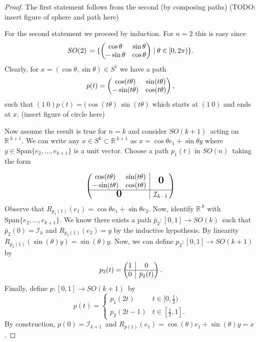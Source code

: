\documentclass[12pt,a4paper]{article}
\newcommand{\rR}{\ensuremath{\mathbb{R}\,}}
\newcommand{\gsok}[1]{\ensuremath{SO(#1)\,}}
\newcommand{\ci}[1]{\ensuremath{\mathcal{I}_{#1}\,}}
\newcommand{\rvline}{\hspace*{-\arraycolsep}\vline\hspace*{-\arraycolsep}}
\newcommand{\bigzero}{\mbox{\normalfont\Large\bfseries 0}}
\begin{document}
\begin{proof}
The first statement follows from the second (by composing paths) (TODO: insert figure of sphere and path here)

For the second statement we proceed by induction. For $n = 2$ this is easy since
\[
\gsok{2} = \{\pmqty{\cos \theta & \sin \theta \\ -\sin \theta & \cos \theta}\mid \theta \in [0, 2\pi )\}.
\]
Clearly, for $x = (\cos\theta, \sin\theta) \in S^1$ we have a path
\[
p(t) = \pmqty{\cos (t\theta) & \sin (t\theta) \\ -\sin (t\theta) & \cos (t\theta)},
\]
such that $(1\ 0)p(t) = (\cos(t\theta)\ \sin(t\theta)$ which starts at $(1\ 0)$ and ends at $x$.
(insert figure of circle here)

Now assume the result is true for $n=k$ and consider \gsok{k+1} acting on $\rR^{k+1}$. We can write any $x \in S^k \subset \rR^{k+1}$ as $x = \cos\theta e_1 + \sin\theta y$ where $y \in \mbox{Span}\{e_2, \hdots, e_{k+1}\}$ is a unit vector. Choose a path $p_1(t)$ in \gsok{n} taking the form

\[
\begin{pmatrix}
  \begin{matrix}
  \cos(t\theta) & \sin(t\theta)  \\
  -\sin(t\theta) &   \cos(t\theta)
  \end{matrix}
  & \rvline & \bigzero
  \\
\hline

  \bigzero & \rvline &
  \ci{k-1}
\end{pmatrix}
\]
Observe that $R_{p_1(1)}(e_1) = \cos\theta e_1 + \sin\theta e_2$. Now, identify $\rR^k$ with $\mbox{Span}\{e_2, \hdots, e_{k+1}\}$. We know there exists a path $\bar{p}_2 : [0, 1] \to \gsok{k}$ such that $\bar{p}_2(0) = \mathcal{I}_k$ and $R_{\bar{p}_2(1)}(e_2) = y$ by the inductive hypothesis. By linearity $R_{\bar{p}_2(1)}(\sin(\theta) y) = \sin(\theta) y$. Now, we can define $p_2:[0, 1] \to \gsok{k+1}$ by
\[
p_2(t) =
\begin{pmatrix}
  1 & \rvline & 0
  \\
\hline

  0 & \rvline & \bar{p}_2(t)
\end{pmatrix}.
\]
Finally, define $p:[0, 1] \to \gsok{k+1}$ by
\[
p(t) =
\begin{cases}
p_1(2t)   & t \in  [0, \frac{1}{2}) \\
p_2(2t-1) & t \in  [\frac{1}{2}, 1].
\end{cases}
\]
By construction, $p(0) = \ci{k+1}$ and $R_{p(1)}(e_1) = \cos(\theta)e_1 + \sin(\theta)y = x$.
\end{proof}
\end{document}
